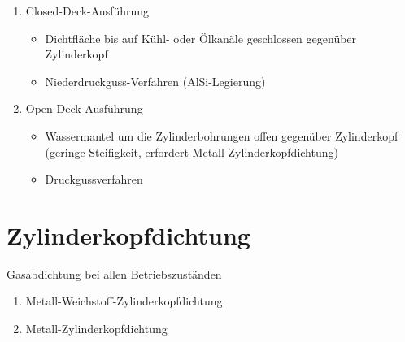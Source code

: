 \begin{enumerate}
\item
  Closed-Deck-Ausführung

  \begin{itemize}
  \item
    Dichtfläche bis auf Kühl- oder Ölkanäle geschlossen gegenüber
    Zylinderkopf
  \item
    Niederdruckguss-Verfahren (AlSi-Legierung)
  \end{itemize}
\item
  Open-Deck-Ausführung

  \begin{itemize}
  \item
    Wassermantel um die Zylinderbohrungen offen gegenüber Zylinderkopf
    (geringe Steifigkeit, erfordert Metall-Zylinderkopfdichtung)
  \item
    Druckgussverfahren
  \end{itemize}
\end{enumerate}

\section{Zylinderkopfdichtung}\label{zylinderkopfdichtung}

Gasabdichtung bei allen Betriebszuständen

\begin{enumerate}
\item
  Metall-Weichstoff-Zylinderkopfdichtung
\item
  Metall-Zylinderkopfdichtung
\end{enumerate}
